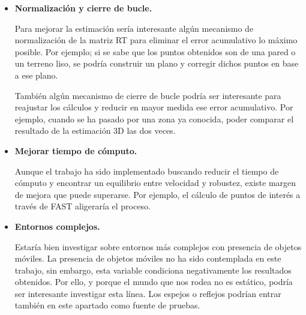 \begin{itemize}
\item \textbf{Normalización y cierre de bucle.}

Para mejorar la estimación sería interesante algún mecanismo de normalización de la matriz RT para eliminar el error acumulativo lo máximo posible. Por ejemplo; si se sabe que los puntos obtenidos son de una pared o un terreno liso, se podría construir un plano y corregir dichos puntos en base a ese plano.

También algún mecanismo de cierre de bucle podría ser interesante para reajustar los cálculos y reducir en mayor medida ese error acumulativo. Por ejemplo, cuando se ha pasado por una zona ya conocida, poder comparar el resultado de la estimación 3D las dos veces.

\item \textbf{Mejorar tiempo de cómputo.}

Aunque el trabajo ha sido implementado buscando reducir el tiempo de cómputo y encontrar un equilibrio entre velocidad y robustez, existe margen de mejora que puede superarse. Por ejemplo, el cálculo de puntos de interés a través de FAST aligeraría el proceso.

\item \textbf{Entornos complejos.}

Estaría bien investigar sobre entornos más complejos con presencia de objetos móviles. La presencia de objetos móviles no ha sido contemplada en este trabajo, sin embargo, esta variable condiciona negativamente los resultados obtenidos. Por ello, y porque el mundo que nos rodea no es estático, podría ser interesante investigar esta línea. Los espejos o reflejos podrían entrar también en este apartado como fuente de pruebas.
\end{itemize}
